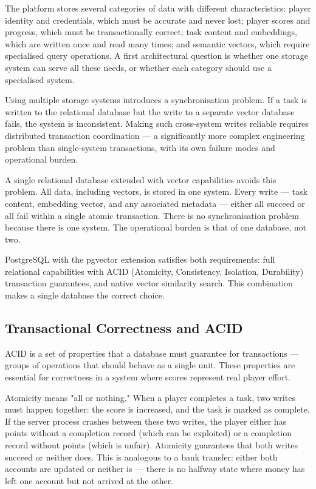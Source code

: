 The platform stores several categories of data with different characteristics: player identity and credentials, which must be accurate and never lost; player scores and progress, which must be transactionally correct; task content and embeddings, which are written once and read many times; and semantic vectors, which require specialised query operations. A first architectural question is whether one storage system can serve all these needs, or whether each category should use a specialised system.

Using multiple storage systems introduces a synchronisation problem. If a task is written to the relational database but the write to a separate vector database fails, the system is inconsistent. Making such cross-system writes reliable requires distributed transaction coordination --- a significantly more complex engineering problem than single-system transactions, with its own failure modes and operational burden.

A single relational database extended with vector capabilities avoids this problem. All data, including vectors, is stored in one system. Every write --- task content, embedding vector, and any associated metadata --- either all succeed or all fail within a single atomic transaction. There is no synchronisation problem because there is one system. The operational burden is that of one database, not two.

PostgreSQL with the pgvector extension satisfies both requirements: full relational capabilities with ACID (Atomicity, Consistency, Isolation, Durability) transaction guarantees, and native vector similarity search. This combination makes a single database the correct choice.

\subsection{Transactional Correctness and ACID}

ACID is a set of properties that a database must guarantee for transactions --- groups of operations that should behave as a single unit. These properties are essential for correctness in a system where scores represent real player effort.

Atomicity means "all or nothing." When a player completes a task, two writes must happen together: the score is increased, and the task is marked as complete. If the server process crashes between these two writes, the player either has points without a completion record (which can be exploited) or a completion record without points (which is unfair). Atomicity guarantees that both writes succeed or neither does. This is analogous to a bank transfer: either both accounts are updated or neither is --- there is no halfway state where money has left one account but not arrived at the other.

